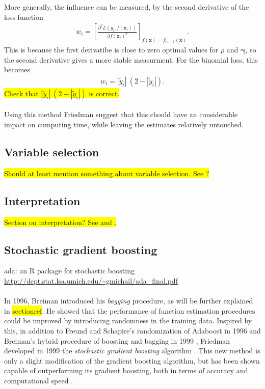 More generally, the influence can be measured, by the second derivative of the loss function
\begin{align}
  w_i = \left[ \frac{\partial^2 L(y_i, f(\mathbf{x}_i)) }{\partial f(\mathbf{x}_i)^2}  \right]_{f(\mathbf{x}) = f_{m-1}(\mathbf{x})}.
\end{align}
This is because the first derivatibe is close to zero optimal values for $\rho$ and $\bm \gamma$, so the second derivative gives a more stable measurment.  For the binomial loss, this becomes 
\begin{align}
  w_i = |\tilde y_i| \: (2 - |\tilde y_i|). 
\end{align}
\colorbox{yellow}{Check that $|\tilde{y}_i|\: (2 - |\tilde{y}_i|)$ is correct.}\\
\\
Using this method Friedman suggest \cite{friedman} that this chould have an considerable impact on cumputing time, while leaving the estimates relatively untouched. 




\subsection{Variable selection}
\label{sub:Variable selection}
\colorbox{yellow}{Should at least mention something about variable selection. See \cite[sec. 8.1]{friedman}?}

\subsection{Interpretation}
\label{sub:Interpretation}
\colorbox{yellow}{Section on interpretation? See \cite[10.3]{modstat} and \cite{friedman}.}

\subsection{Stochastic gradient boosting}
\label{sub:Stochastic gradient boosting}
ada: an R package for stochastic boosting \url{http://dept.stat.lsa.umich.edu/~gmichail/ada_final.pdf} \\
\\
In 1996, Breiman \cite{Breiman1996} introduced his \textit{bagging} procedure, as will be further explained in  \colorbox{yellow}{sectionref}. He showed that the performance of function estimation procedures could be improved by introducing randomness in the training data. Inspired by this, in addition to Freund and Schapire's randomization of Adaboost in 1996 \cite{freund1996} and Breiman's hybrid procedure of boosting and bagging in 1999 \cite{breiman1999}, Friedman developed in 1999 the \textit{stochastic gradient boosting} algorithm \cite{FriedmanStochBoost}.
This new method is only a slight modification of the gradient boosting algorithm, but has been shown capable of outperforming its gradient boosting, both in terms of accuracy and computational speed  \cite{FriedmanStochBoost}.

